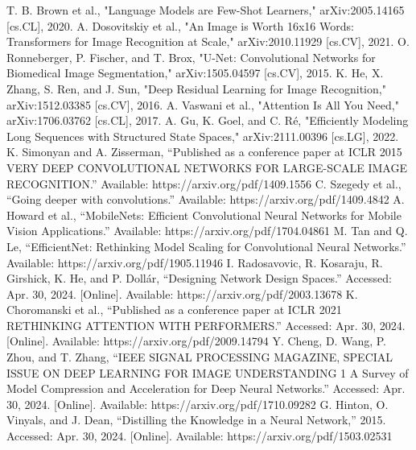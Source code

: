 \documentclass[conference]{IEEEtran}
\begin{document}
\begin{thebibliography}{00}
     T. B. Brown et al., "Language Models are Few-Shot Learners," arXiv:2005.14165 [cs.CL], 2020.
     A. Dosovitskiy et al., "An Image is Worth 16x16 Words: Transformers for Image Recognition at Scale," arXiv:2010.11929 [cs.CV], 2021.
     O. Ronneberger, P. Fischer, and T. Brox, "U-Net: Convolutional Networks for Biomedical Image Segmentation," arXiv:1505.04597 [cs.CV], 2015.
     K. He, X. Zhang, S. Ren, and J. Sun, "Deep Residual Learning for Image Recognition," arXiv:1512.03385 [cs.CV], 2016.
     A. Vaswani et al., "Attention Is All You Need," arXiv:1706.03762 [cs.CL], 2017.
     A. Gu, K. Goel, and C. Ré, "Efficiently Modeling Long Sequences with Structured State Spaces," arXiv:2111.00396 [cs.LG], 2022.
     K. Simonyan and A. Zisserman, “Published as a conference paper at ICLR 2015 VERY DEEP CONVOLUTIONAL NETWORKS FOR LARGE-SCALE IMAGE RECOGNITION.” Available: https://arxiv.org/pdf/1409.1556
     C. Szegedy et al., “Going deeper with convolutions.” Available: https://arxiv.org/pdf/1409.4842
     A. Howard et al., “MobileNets: Efficient Convolutional Neural Networks for Mobile Vision Applications.” Available: https://arxiv.org/pdf/1704.04861
     M. Tan and Q. Le, “EfficientNet: Rethinking Model Scaling for Convolutional Neural Networks.” Available: https://arxiv.org/pdf/1905.11946
     I. Radosavovic, R. Kosaraju, R. Girshick, K. He, and P. Dollár, “Designing Network Design Spaces.” Accessed: Apr. 30, 2024. [Online]. Available: https://arxiv.org/pdf/2003.13678
     K. Choromanski et al., “Published as a conference paper at ICLR 2021 RETHINKING ATTENTION WITH PERFORMERS.” Accessed: Apr. 30, 2024. [Online]. Available: https://arxiv.org/pdf/2009.14794
     Y. Cheng, D. Wang, P. Zhou, and T. Zhang, “IEEE SIGNAL PROCESSING MAGAZINE, SPECIAL ISSUE ON DEEP LEARNING FOR IMAGE UNDERSTANDING 1 A Survey of Model Compression and Acceleration for Deep Neural Networks.” Accessed: Apr. 30, 2024. [Online]. Available: https://arxiv.org/pdf/1710.09282
     G. Hinton, O. Vinyals, and J. Dean, “Distilling the Knowledge in a Neural Network,” 2015. Accessed: Apr. 30, 2024. [Online]. Available: https://arxiv.org/pdf/1503.02531

\end{thebibliography}
\end{document}
